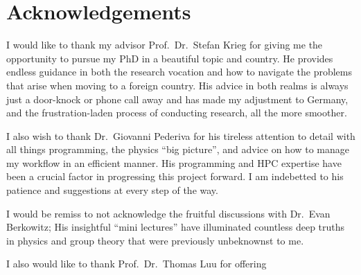 \chapter*{Acknowledgements}
\label{sec:ack}

I would like to thank my advisor Prof.\ Dr.\ Stefan Krieg for giving me the opportunity to pursue my PhD in a beautiful topic and country. He provides endless guidance in both the research vocation and how to navigate the problems that arise when moving to a foreign country. His advice in both realms is always just a door-knock or phone call away and has made my adjustment to Germany, and the frustration-laden process of conducting research, all the more smoother.       

I also wish to thank Dr.\ Giovanni Pederiva for his tireless attention to detail with all things programming, the physics ``big picture'', and advice on how to manage my workflow in an efficient manner. His programming and HPC expertise have been a crucial factor in progressing this project forward. I am indebetted to his patience and suggestions at every step of the way. 

I would be remiss to not acknowledge the fruitful discussions with Dr.\ Evan Berkowitz; His insightful ``mini lectures'' have illuminated countless deep truths in physics and group theory that were previously unbeknownst to me. 

I also would like to thank Prof.\ Dr.\ Thomas Luu for offering   


